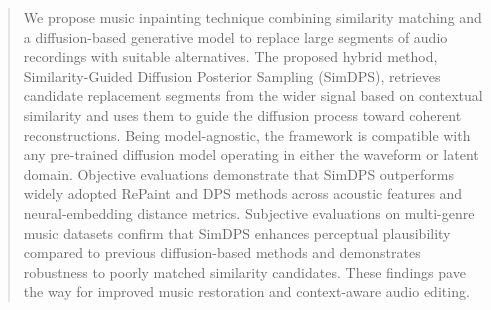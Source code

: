 \documentclass{article}
\begin{document}
\begin{abstract}
We propose music inpainting technique combining similarity matching and a diffusion-based generative model to replace large segments of audio recordings with suitable alternatives. %
The proposed hybrid method, Similarity-Guided Diffusion Posterior Sampling (SimDPS), retrieves candidate replacement segments from the wider signal based on contextual similarity 
and uses them to guide the diffusion process toward coherent reconstructions. 
Being model-agnostic, the framework is compatible with any pre-trained diffusion model operating in either the waveform or latent domain.
Objective evaluations demonstrate that SimDPS outperforms widely adopted RePaint and DPS methods across acoustic features and neural-embedding distance metrics.
Subjective evaluations on multi-genre music datasets confirm that SimDPS enhances perceptual plausibility compared to previous diffusion-based methods and demonstrates robustness to poorly matched similarity candidates. These findings pave the way for improved music restoration and context-aware audio editing. %




\end{abstract}
\end{document}
